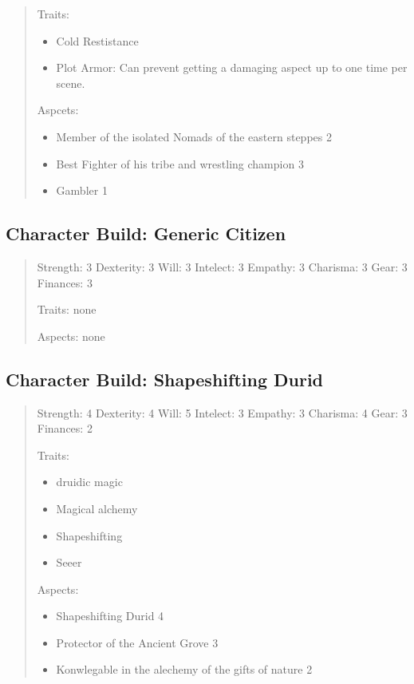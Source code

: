 \documentclass[11pt]{article}
\begin{document}
{\begin{quote}
Traits:
\begin{itemize}
\item Cold Restistance
\item Plot Armor: Can prevent getting a damaging aspect up to one time per scene.
\end{itemize}

Aspcets:
\begin{itemize}
\item Member of the isolated Nomads of the eastern steppes 2
\item Best Fighter of his tribe and wrestling champion 3
\item Gambler 1
\end{itemize}
\end{quote}

\subsection{Character Build: Generic Citizen}
\label{sec:orgaa01aeb}

\begin{quote}
Strength: 3
Dexterity: 3
Will: 3
Intelect: 3
Empathy: 3
Charisma: 3
Gear: 3
Finances: 3

Traits:
none

Aspects:
none
\end{quote}

\subsection{Character Build: Shapeshifting Durid}
\label{sec:orgecbe4a4}

\begin{quote}
Strength: 4
Dexterity: 4
Will: 5
Intelect: 3
Empathy: 3
Charisma: 4
Gear: 3
Finances: 2

Traits:
\begin{itemize}
\item druidic magic
\item Magical alchemy
\item Shapeshifting
\item Seeer
\end{itemize}

Aspects:
\begin{itemize}
\item Shapeshifting Durid 4
\item Protector of the Ancient Grove 3
\item Konwlegable in the alechemy of the gifts of nature 2
\end{itemize}
\end{quote}

}
\end{document}

